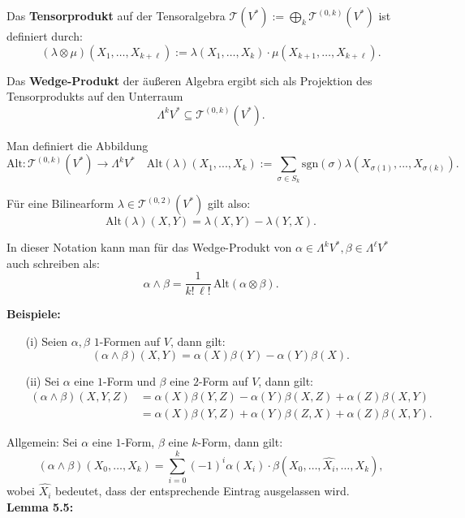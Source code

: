 \documentclass[fleqn, 12pt, letterpaper]{article}
\begin{document}
Das \textbf{Tensorprodukt} auf der Tensoralgebra \( \mathcal{T}(V^*) := \bigoplus_k \mathcal{T}^{(0,k)}(V^*) \) ist definiert durch:
\[
(\lambda \otimes \mu)(X_1, \dots, X_{k+\ell}) := \lambda(X_1, \dots, X_k) \cdot \mu(X_{k+1}, \dots, X_{k+\ell}).
\]

Das \textbf{Wedge-Produkt} der äußeren Algebra ergibt sich als Projektion des Tensorprodukts auf den Unterraum
\[
\Lambda^k V^* \subseteq \mathcal{T}^{(0,k)}(V^*).
\]

Man definiert die Abbildung
\[
\mathrm{Alt} \colon \mathcal{T}^{(0,k)}(V^*) \to \Lambda^k V^* \quad \mathrm{Alt}(\lambda)(X_1, ...,X_k) := \sum_{\sigma \in S_{k}} \mathrm{sgn}(\sigma)\lambda(X_{\sigma(1)}, ...,X_{\sigma(k)}) .
\]

Für eine Bilinearform \( \lambda \in \mathcal{T}^{(0,2)}(V^*) \) gilt also:
\[
\mathrm{Alt}(\lambda)(X, Y) = \lambda(X, Y) - \lambda(Y, X).
\]

In dieser Notation kann man für das Wedge-Produkt von \( \alpha \in \Lambda^k V^*, \beta \in \Lambda^\ell V^* \) auch schreiben als:
\[
\alpha \wedge \beta = \frac{1}{k! \, \ell!} \, \mathrm{Alt}(\alpha \otimes \beta).
\]

\textbf{Beispiele:}

\begin{itemize}
  \item[(i)] Seien \( \alpha, \beta \) \( 1 \)-Formen auf \( V \), dann gilt:
  \[
  (\alpha \wedge \beta)(X, Y) = \alpha(X) \beta(Y) - \alpha(Y) \beta(X).
  \]
  
  \item[(ii)] Sei \( \alpha \) eine \( 1 \)-Form und \( \beta \) eine \( 2 \)-Form auf \( V \), dann gilt:
  \begin{align*}
  (\alpha \wedge \beta)(X, Y, Z)
  &= \alpha(X)\beta(Y, Z) - \alpha(Y)\beta(X, Z) + \alpha(Z)\beta(X, Y) \\
  &= \alpha(X)\beta(Y, Z) + \alpha(Y)\beta(Z, X) + \alpha(Z)\beta(X, Y).
  \end{align*}
\end{itemize}
  
Allgemein: Sei \( \alpha \) eine \( 1 \)-Form, \( \beta \) eine \( k \)-Form, dann gilt:
\[
(\alpha \wedge \beta)(X_0, \dots, X_k) = \sum_{i=0}^k (-1)^i \alpha(X_i)\cdot \beta(X_0, \dots, \widehat{X_i}, \dots, X_k),
\]
wobei \( \widehat{X_i} \) bedeutet, dass der entsprechende Eintrag ausgelassen wird.\\

\textbf{Lemma 5.5:}
\end{document}
